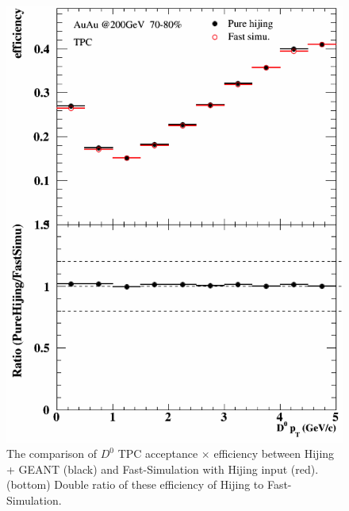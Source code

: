 \begin{figure}[htbp]
\begin{minipage}[htbp]{0.47\linewidth}
\includegraphics[width=1.0\textwidth,angle=0]{figure/Run14_D0HFT/70_80_1.png} 
\caption{ The comparison of $D^0$ TPC acceptance $\times$ efficiency between Hijing + GEANT (black) and Fast-Simulation with Hijing input (red). (bottom) Double ratio of these efficiency of Hijing to Fast-Simulation.\label{70_80_1}}
\end{minipage}
\end{figure}


